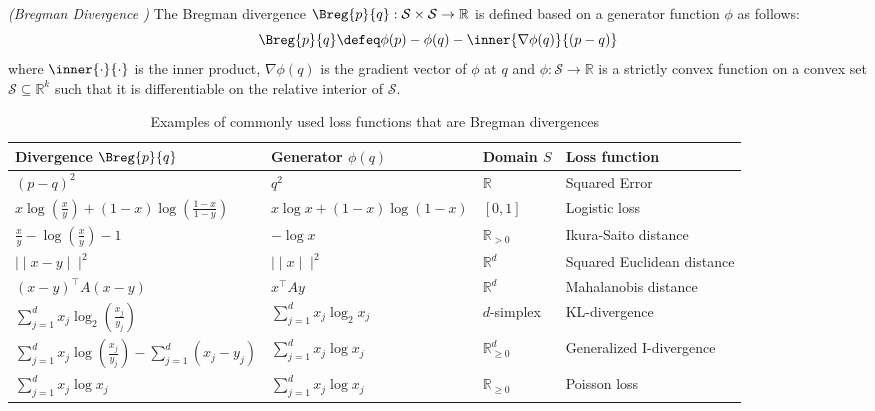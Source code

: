 \documentclass[
	twoside=false, %
]{kaobook}
\begin{document}
\begin{definition} \label{def:bregman-divergence}
\textit{(Bregman Divergence \cite{pfau_GeneralizedBiasVarianceDecomposition_, adlam_UnderstandingBiasvarianceTradeoff_2022})} The Bregman divergence $\Breg{p}{q} : \mathcal{S} \times \mathcal{S}\to \mathbb{R}$ is defined based on a generator function $\phi$ as follows:
$$
\Breg{p}{q} \defeq \phi(p) - \phi(q) - \inner{\nabla \phi(q)}{(p-q)}
$$
where $\inner{\cdot}{\cdot}$ is the inner product, $\nabla \phi(q)$ is the gradient vector of $\phi$ at $q$ and $\phi: \mathcal{S} \to \mathbb{R}$ is a strictly convex function on a convex set $\mathcal{S} \subseteq \mathbb{R}^k$ such that it is differentiable on the relative interior of $\mathcal{S}$.
\end{definition}


\begin{table}[hb]
    \centering
    \caption{
      Examples of commonly used loss functions that are Bregman divergences 
      \cite{banerjee_ClusteringBregmanDivergences_2004, wood_UnifiedTheoryDiversity_2023} 
    }
    \begin{tabular}{|l|l|l|l|}
    \hline
        Divergence $\Breg{p}{q}$ & Generator $\phi(q)$ & Domain $S$ & Loss function \\ \hline
        $(p-q)^2$ & $q^2$ & $\mathbb{R}$ & Squared Error \\ \hline
        $x \log \left(\frac{x}{y}\right)+(1-x) \log \left(\frac{1-x}{1-y}\right)$ & $x \log x+(1-x) \log (1-x)$ & $[0,1]$ & Logistic loss \\ \hline
        $\frac{x}{y}-\log \left(\frac{x}{y}\right)-1$ & $-\log x$ & $\mathbb{R}_{>0}$ & Ikura-Saito distance \\ \hline
        $\mid\mid x-y \mid\mid^2$ & $\mid\mid x\mid\mid^2$ & $\mathbb{R}^d$ & Squared Euclidean distance \\ \hline
        $(x-y)^\top A (x-y)$ & $x^\top A y$ & $\mathbb{R}^d$ & Mahalanobis distance \\ \hline
        $\sum_{j=1}^d x_j \log _2\left(\frac{x_j}{y_j}\right)$ & $\sum_{j=1}^d x_j \log _2 x_j$ & $d$-simplex & KL-divergence \\ \hline
        $\sum_{j=1}^d x_j \log \left(\frac{x_j}{y_j}\right)-\sum_{j=1}^d\left(x_j-y_j\right)$ & $\sum_{j=1}^d x_j \log x_j$ & $\mathbb{R}^d_{\geq {0}}$ & Generalized I-divergence \\ \hline
        $\sum_{j=1}^d x_j \log x_j$ & $\sum_{j=1}^d x_j \log x_j$ & $\mathbb{R}_{\geq {0}}$ & Poisson loss \\ \hline
    \end{tabular}
    \label{tab:bregman-examples}
\end{table}
\end{document}
